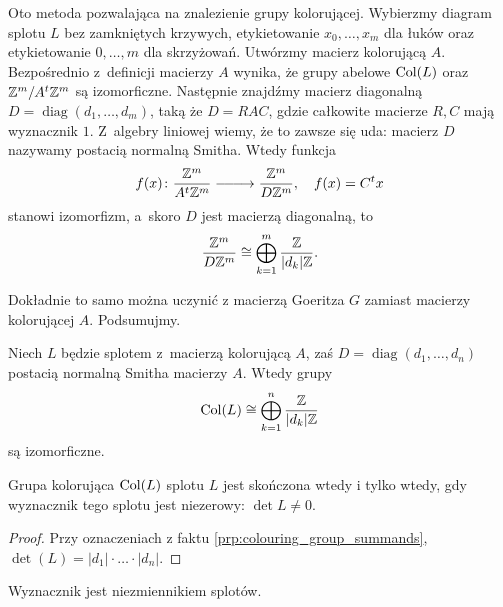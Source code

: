 Oto metoda pozwalająca na znalezienie grupy kolorującej.
Wybierzmy diagram splotu $L$ bez zamkniętych krzywych, etykietowanie $x_0, \ldots, x_m$ dla łuków oraz etykietowanie $0, \ldots, m$ dla skrzyżowań.
Utwórzmy macierz kolorującą $A$.
Bezpośrednio z~definicji macierzy $A$ wynika, że grupy abelowe $\operatorname{Col}(L)$ oraz $\mathbb Z^m / A^t \mathbb Z^m$ są izomorficzne.
Następnie znajdźmy macierz diagonalną $D = \operatorname{diag}(d_1, \ldots, d_m)$, taką że $D = RAC$, gdzie całkowite macierze $R, C$ mają wyznacznik $1$.
Z~algebry liniowej wiemy, że to zawsze się uda: macierz $D$ nazywamy postacią normalną Smitha.
Wtedy funkcja
\begin{equation}
    f(x) \colon \frac{\Z^m}{A^t \Z^m} \verylongrightarrow \frac{\Z^m}{D\Z^m}, \quad f(x) = C^t x
\end{equation}
stanowi izomorfizm, a~skoro $D$ jest macierzą diagonalną, to
\begin{equation}
    \frac{\mathbb Z^m}{D\mathbb Z^m} \cong \bigoplus_{k=1}^m \frac{\mathbb Z}{|d_k| \mathbb Z}.
\end{equation}

Dokładnie to samo można uczynić z macierzą Goeritza $G$ zamiast macierzy kolorującej $A$.
Podsumujmy.

\begin{proposition}
\label{prp:colouring_group_summands}%
    Niech $L$ będzie splotem z~macierzą kolorującą $A$, zaś $D = \operatorname{diag}(d_1, \ldots, d_n)$ postacią normalną Smitha macierzy $A$.
    Wtedy grupy 
    \begin{equation}
        \operatorname{Col}(L) \cong \bigoplus_{k=1}^n \frac{\mathbb Z}{|d_k| \mathbb Z}
    \end{equation}
    są izomorficzne.
\end{proposition}

\begin{corollary}
    Grupa kolorująca $\operatorname{Col}(L)$ splotu $L$ jest skończona wtedy i tylko wtedy, gdy wyznacznik tego splotu jest niezerowy: $\det L \neq 0$.
\end{corollary}

\begin{proof}
    Przy oznaczeniach z faktu \ref{prp:colouring_group_summands}, $\det(L) = |d_1| \cdot \ldots \cdot |d_n|$.
\end{proof}

\begin{corollary}
%
\label{cor:determinant_invariant}%
    Wyznacznik jest niezmiennikiem splotów.
\end{corollary}

